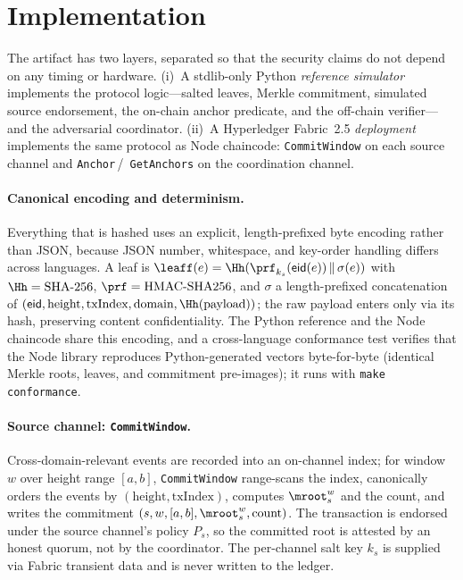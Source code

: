 \section{Implementation}
\label{sec:impl}

The artifact has two layers, separated so that the security claims do not depend
on any timing or hardware. (i)~A stdlib-only Python \emph{reference simulator}
implements the protocol logic---salted leaves, Merkle commitment, simulated
source endorsement, the on-chain anchor predicate, and the off-chain
verifier---and the adversarial coordinator. (ii)~A Hyperledger Fabric~2.5
\emph{deployment} implements the same protocol as Node chaincode:
\texttt{CommitWindow} on each source channel and \texttt{Anchor}\,/\,%
\texttt{GetAnchors} on the coordination channel.

\paragraph{Canonical encoding and determinism.}
Everything that is hashed uses an explicit, length-prefixed byte encoding rather
than JSON, because JSON number, whitespace, and key-order handling differs
across languages. A leaf is
$\leaff(e)=\Hh(\prf_{k_s}(\mathsf{eid}(e))\,\|\,\sigma(e))$ with
$\Hh=\text{SHA-256}$, $\prf=\text{HMAC-SHA256}$, and $\sigma$ a length-prefixed
concatenation of $(\mathsf{eid},\text{height},\text{txIndex},\text{domain},
\Hh(\text{payload}))$; the raw payload enters only via its hash, preserving
content confidentiality. The Python reference and the Node chaincode share this
encoding, and a cross-language conformance test verifies that the Node library
reproduces Python-generated vectors byte-for-byte (identical Merkle roots,
leaves, and commitment pre-images); it runs with \texttt{make conformance}.

\paragraph{Source channel: \texttt{CommitWindow}.}
Cross-domain-relevant events are recorded into an on-channel index; for window
$w$ over height range $[a,b]$, \texttt{CommitWindow} range-scans the index,
canonically orders the events by $(\text{height},\text{txIndex})$, computes
$\mroot^w_s$ and the count, and writes the commitment
$(s,w,[a,b],\mroot^w_s,\text{count})$. The transaction is endorsed under the
source channel's policy $P_s$, so the committed root is attested by an honest
quorum, not by the coordinator. The per-channel salt key $k_s$ is supplied via
Fabric transient data and is never written to the ledger.

